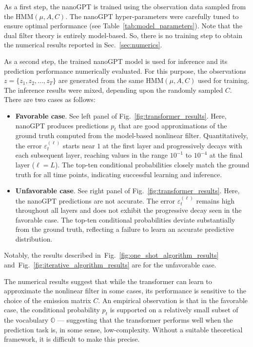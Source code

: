 \documentclass[twoside,11pt]{article}
\def\Sec#1{Sec.~\ref{#1}}
\def\Fig#1{Fig.~\ref{#1}}
\def\Sec#1{Sec.~\ref{#1}}
\def\Sec#1{Sec~\ref{#1}}
\def\Fig#1{Fig.~\ref{#1}}
\def\Sec#1{Sec.~\ref{#1}}
\def\Sec#1{Sec.~\ref{#1}}
\def\bO{\mathbb{O}}
\begin{document}
As a first step, the nanoGPT is trained using the observation data
sampled from the $\text{HMM}(\mu,A,C)$.  The nanoGPT hyper-parameters were carefully tuned to
ensure optimal performance (see Table~\ref{tab:model_parameters}).  Note that the dual filter theory is
entirely model-based.  So, there is no training step to obtain the
numerical results reported in \Sec{sec:numerics}. 


As a second step, the trained nanoGPT model is used for inference and
its prediction performance numerically evaluated.  For this purpose,
the observations $z=\{z_1,z_2,\hdots,z_T\}$ are generated from the
same $\text{HMM}(\mu,A,C)$ used for training.  The inference results were
mixed, depending upon the randomly sampled $C$.  There are two cases as follows:
\begin{itemize}
\item \textbf{Favorable case}. See left panel of
  \Fig{fig:transformer_results}.  Here, nanoGPT produces
  predictions $p_t$ that are good approximations of the ground truth
  computed from the model-based 
  nonlinear filter.  Quantitatively, the error
  $\varepsilon_t^{(\ell)}$ starts near $1$ at the first layer and
  progressively decays with each subsequent layer, reaching values in
  the range $10^{-1}$ to $10^{-4}$ at the final layer ($\ell = L$). 
The top-ten conditional probabilities closely match the ground
truth for all time points, indicating successful
learning and inference. 
\item \textbf{Unfavorable case}. See right panel of
  \Fig{fig:transformer_results}.  Here, the nanoGPT predictions are
  not accurate.  
The error $\varepsilon_t^{(\ell)}$ remains high throughout all layers and does not exhibit the progressive decay seen in the favorable case.
The top-ten conditional probabilities deviate substantially from the
ground truth, reflecting a failure to learn an accurate predictive
distribution. 
\end{itemize}
Notably, the results described in~\Fig{fig:one_shot_algorithm_results}
and~\Fig{fig:iterative_algorithm_results} are for the unfavorable
case.

The numerical results suggest that while the transformer can learn to
approximate the nonlinear filter in some cases, its performance is
sensitive to the choice of the emission matrix $C$. An empirical
observation is that in the favorable case, the conditional probability
$p_t$ is supported on a relatively small subset of the vocabulary
$\bO$ --- suggesting that the transformer performs well when the
prediction task is, in some sense, low-complexity. Without a suitable
theoretical framework, it is difficult to make this precise.
\end{document}
